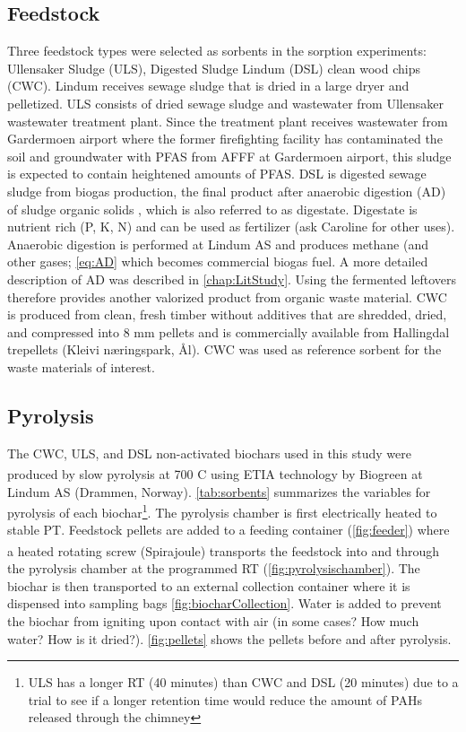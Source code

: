 \subsection{Feedstock}
Three feedstock types were selected as sorbents in the sorption experiments: Ullensaker Sludge (ULS), Digested Sludge Lindum (DSL) clean wood chips (CWC). Lindum receives sewage sludge that is dried in a large dryer and pelletized. ULS consists of dried sewage sludge and wastewater from Ullensaker wastewater treatment plant. Since the treatment plant receives wastewater from Gardermoen airport where the former firefighting facility has contaminated the soil and groundwater with PFAS from AFFF at Gardermoen airport, this sludge is expected to contain heightened amounts of PFAS. DSL is digested sewage sludge from biogas production, the final product after anaerobic digestion (AD) of sludge organic solids \citep{Alhashimi2017}, which is also referred to as digestate. Digestate is nutrient rich (P, K, N) and can be used as fertilizer (ask Caroline for other uses). Anaerobic digestion is performed at Lindum AS and produces methane (and other gases; \cref{eq:AD} which becomes commercial biogas fuel. A more detailed description of AD was described in \cref{chap:LitStudy}. Using the fermented leftovers therefore provides another valorized product from organic waste material. CWC is produced from clean, fresh timber without additives that are shredded, dried, and compressed into 8 mm pellets and is commercially available from Hallingdal trepellets (Kleivi næringspark, Ål). CWC was used as reference sorbent for the waste materials of interest.

\subsection{Pyrolysis}
The CWC, ULS, and DSL non-activated biochars used in this study were produced by slow pyrolysis at 700 \textdegree C using ETIA technology by Biogreen\textsuperscript{\textcopyright} at Lindum AS (Drammen, Norway). \cref{tab:sorbents} summarizes the variables for pyrolysis of each biochar\footnote{ULS has a longer RT (40 minutes) than CWC and DSL (20 minutes) due to a trial to see if a longer retention time would reduce the amount of PAHs released through the chimney}. The pyrolysis chamber is first electrically heated to stable PT. Feedstock pellets are added to a feeding container (\cref{fig:feeder}) where a heated rotating screw (Spirajoule\textsuperscript{\textregistered}) transports the feedstock into and through the pyrolysis chamber at the programmed RT (\cref{fig:pyrolysischamber}). The biochar is then transported to an external collection container where it is dispensed into sampling bags \cref{fig:biocharCollection}. Water is added to prevent the biochar from igniting upon contact with air (in some cases? How much water? How is it dried?). \cref{fig:pellets} shows the pellets before and after pyrolysis. 

